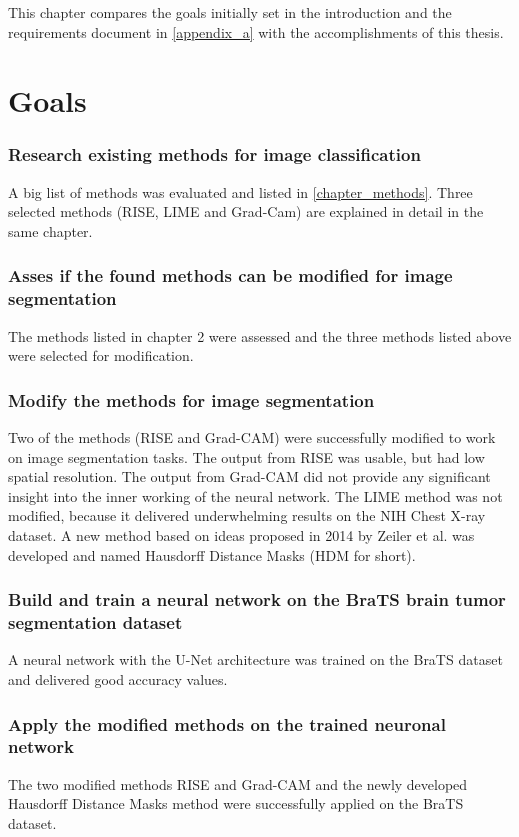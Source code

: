This chapter compares the goals initially set in the introduction and the requirements document in \autoref{appendix_a}  with the accomplishments of this thesis.

\section{Goals}

\subsubsection{Research existing methods for image classification}
A big list of methods was evaluated and listed in \autoref{chapter_methods}. Three selected methods (RISE, LIME and Grad-Cam) are explained in detail in the same chapter.

\subsubsection{Asses if the found methods can be modified for image segmentation}
The methods listed in chapter 2 were assessed and the three methods listed above were selected for modification.

\subsubsection{Modify the methods for image segmentation}
Two of the methods (RISE and Grad-CAM) were successfully modified to work on image segmentation tasks. The output from RISE was usable, but had low spatial resolution. The output from Grad-CAM did not provide any significant insight into the inner working of the neural network.  The LIME method was not modified, because it delivered underwhelming results on the NIH Chest X-ray dataset. A new method based on ideas proposed in 2014 by Zeiler et al.\cite{zeiler2014visualizing} was developed and named Hausdorff Distance Masks (HDM for short).

\subsubsection{Build and train a neural network on the BraTS brain tumor segmentation dataset}
A neural network with the U-Net architecture was trained on the BraTS dataset and delivered good accuracy values.

\subsubsection{Apply the modified methods on the trained neuronal network}
The two modified methods RISE and Grad-CAM and the newly developed Hausdorff Distance Masks method were successfully applied on the BraTS dataset.

